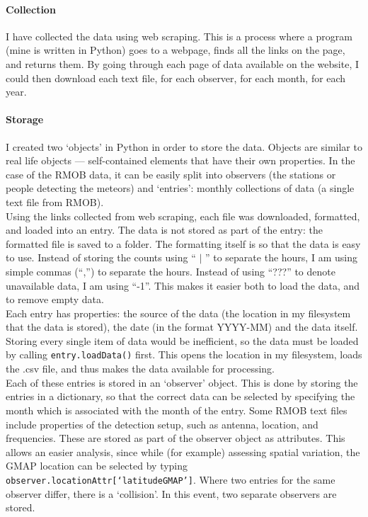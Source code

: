 \paragraph{Collection\\}
I have collected the data using web scraping. This is a process where a program (mine is written in Python) goes to a webpage, finds all the links on the page, and returns them. By going through each page of data available on the website, I could then download each text file, for each observer, for each month, for each year.\\
\paragraph{Storage\\}
I created two `objects' in Python in order to store the data. Objects are similar to real life objects --- self-contained elements that have their own properties. In the case of the RMOB data, it can be easily split into observers (the stations or people detecting the meteors) and `entries': monthly collections of data (a single text file from RMOB).\\
Using the links collected from web scraping, each file was downloaded, formatted, and loaded into an entry. The data is not stored as part of the entry: the formatted file is saved to a folder. The formatting itself is so that the data is easy to use. Instead of storing the counts using `` $|$ '' to separate the hours, I am using simple commas (``,'') to separate the hours. Instead of using ``???'' to denote unavailable data, I am using ``-1''. This makes it easier both to load the data, and to remove empty data.\\
Each entry has properties: the source of the data (the location in my filesystem that the data is stored), the date (in the format YYYY-MM) and the data itself. Storing every single item of data would be inefficient, so the data must be loaded by calling \texttt{entry.loadData()} first. This opens the location in my filesystem, loads the .csv file, and thus makes the data available for processing. \\
Each of these entries is stored in an `observer' object. This is done by storing the entries in a dictionary, so that the correct data can be selected by specifying the month which is associated with the month of the entry. Some RMOB text files include properties of the detection setup, such as antenna, location, and frequencies. These are stored as part of the observer object as attributes. This allows an easier analysis, since while (for example) assessing spatial variation, the GMAP location can be selected by typing \texttt{observer.locationAttr[`latitudeGMAP']}. Where two entries for the same observer differ, there is a `collision'. In this event, two separate observers are stored.
